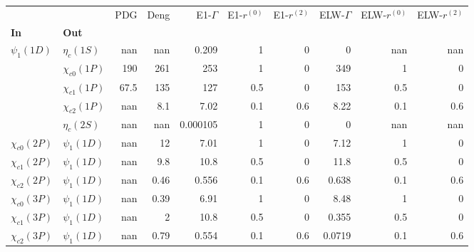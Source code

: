\begin{tabular}{l|l|r|r|r|r|r|r|r|r}
\toprule
                &                &  PDG &  Deng &  E1-$\Gamma$ &  E1-$r^{(0)}$ &  E1-$r^{(2)}$ &  ELW-$\Gamma$ &  ELW-$r^{(0)}$ &  ELW-$r^{(2)}$ \\
\textbf{In} & \textbf{Out} &      &       &              &               &               &               &                &                \\
\midrule
\textbf{$\psi_{1}(1D)$} & \textbf{$\eta_{c}(1S)$} &  nan &   nan &        0.209 &             1 &             0 &             0 &            nan &            nan \\
                & \textbf{$\chi_{c0}(1P)$} &  190 &   261 &          253 &             1 &             0 &           349 &              1 &              0 \\
                & \textbf{$\chi_{c1}(1P)$} & 67.5 &   135 &          127 &           0.5 &             0 &           153 &            0.5 &              0 \\
                & \textbf{$\chi_{c2}(1P)$} &  nan &   8.1 &         7.02 &           0.1 &           0.6 &          8.22 &            0.1 &            0.6 \\
                & \textbf{$\eta_{c}(2S)$} &  nan &   nan &     0.000105 &             1 &             0 &             0 &            nan &            nan \\
\textbf{$\chi_{c0}(2P)$} & \textbf{$\psi_{1}(1D)$} &  nan &    12 &         7.01 &             1 &             0 &          7.12 &              1 &              0 \\
\textbf{$\chi_{c1}(2P)$} & \textbf{$\psi_{1}(1D)$} &  nan &   9.8 &         10.8 &           0.5 &             0 &          11.8 &            0.5 &              0 \\
\textbf{$\chi_{c2}(2P)$} & \textbf{$\psi_{1}(1D)$} &  nan &  0.46 &        0.556 &           0.1 &           0.6 &         0.638 &            0.1 &            0.6 \\
\textbf{$\chi_{c0}(3P)$} & \textbf{$\psi_{1}(1D)$} &  nan &  0.39 &         6.91 &             1 &             0 &          8.48 &              1 &              0 \\
\textbf{$\chi_{c1}(3P)$} & \textbf{$\psi_{1}(1D)$} &  nan &     2 &         10.8 &           0.5 &             0 &         0.355 &            0.5 &              0 \\
\textbf{$\chi_{c2}(3P)$} & \textbf{$\psi_{1}(1D)$} &  nan &  0.79 &        0.554 &           0.1 &           0.6 &        0.0719 &            0.1 &            0.6 \\
\bottomrule
\end{tabular}

